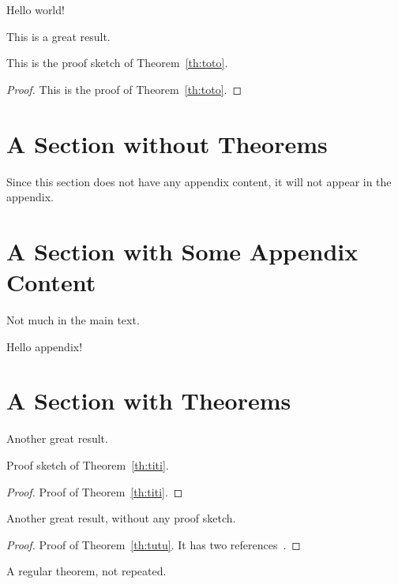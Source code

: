\usepackage{../../apxproof}
\usepackage{hyperref}



Hello world!

\begin{theoremrep}
  \label{th:toto}
  This is a great result.
\end{theoremrep}

\begin{proofsketch}
  This is the proof sketch of Theorem~\ref{th:toto}.
\end{proofsketch}

\begin{proof}
  This is the proof of Theorem~\ref{th:toto}.
\end{proof}

\section{A Section without Theorems}

Since this section does not have any appendix content, it will not appear in the
appendix. \cite{brin1998anatomy}

\section{A Section with Some Appendix Content}

Not much in the main text.

\begin{toappendix}
  Hello appendix!
\end{toappendix}

\section{A Section with Theorems}

\begin{theoremrep}
  \label{th:titi}
  Another great result.
\end{theoremrep}

\begin{proofsketch}
  Proof sketch of Theorem~\ref{th:titi}.
\end{proofsketch}

\begin{proof}
  Proof of Theorem~\ref{th:titi}.
\end{proof}

\begin{theoremrep}
  \label{th:tutu}
  Another great result, without any proof sketch.
\end{theoremrep}

\begin{proof}
  Proof of Theorem~\ref{th:tutu}. It has two
  references~\cite{sitemaps,brin1998anatomy}.
\end{proof}

\begin{theorem}
  A regular theorem, not repeated.
\end{theorem}





